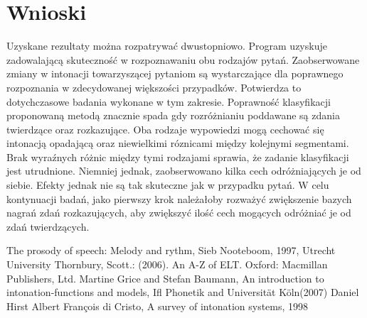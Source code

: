 \documentclass[a4paper,12 pt]{article}
\begin{document}
\section{Wnioski}
Uzyskane rezultaty można rozpatrywać dwustopniowo. Program uzyskuje zadowalającą skuteczność w rozpoznawaniu obu rodzajów pytań. Zaobserwowane zmiany w intonacji towarzyszącej pytaniom są wystarczające dla poprawnego rozpoznania w zdecydowanej większości przypadków. Potwierdza to dotychczasowe badania wykonane w tym zakresie. 
\newline
\newline Poprawność klasyfikacji proponowaną metodą znacznie spada gdy rozróżnianiu poddawane są zdania twierdzące oraz rozkazujące. Oba rodzaje wypowiedzi mogą cechować się intonacją opadającą oraz niewielkimi róznicami między kolejnymi segmentami. Brak wyraźnych różnic między tymi rodzajami sprawia, że zadanie klasyfikacji jest utrudnione. Niemniej jednak, zaobserwowano kilka cech odróżniających je od siebie. Efekty jednak nie są tak skuteczne jak w przypadku pytań.
\newline
\newline
W celu kontynuacji badań, jako pierwszy krok należałoby rozważyć zwiększenie bazych nagrań zdań rozkazujących, aby zwiększyć ilość cech mogących odróżniać je od zdań twierdzących.
\newpage
\begin{thebibliography}{99}
The prosody of speech: Melody and rythm, Sieb Nooteboom, 1997, Utrecht University
Thornbury, Scott.:
 (2006). An A-Z of ELT. Oxford: Macmillan Publishers, Ltd.
Martine Grice and Stefan Baumann, An introduction to intonation-functions and models, Ifl Phonetik and Universität Köln(2007)
Daniel Hirst Albert François di Cristo, A survey of intonation systems, 1998




\end{thebibliography}
\end{document}
